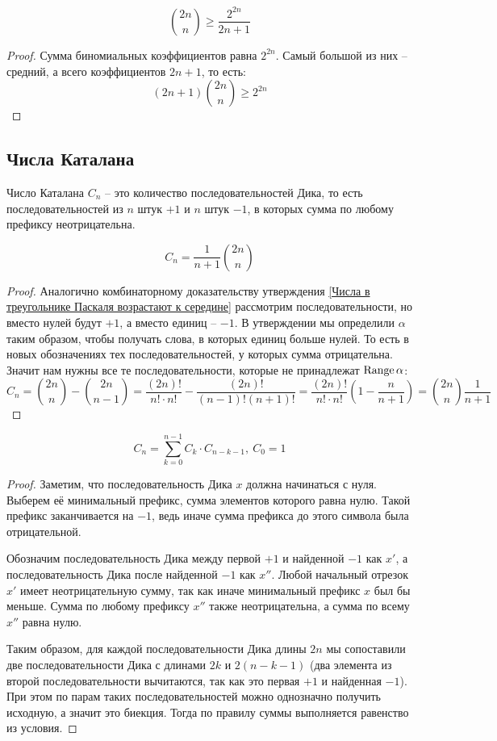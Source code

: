 \documentclass[12pt]{article}
\begin{document}
\begin{statement}
	\[\binom{2n}{n}\geqslant \frac{2^{2n}}{2n+1}\]	
	\begin{proof}
		Сумма биномиальных коэффициентов равна $2^{2n}$. Самый большой из
		них -- средний, а всего коэффициентов $2n+1$, то есть:
		\[(2n+1)\binom{2n}{n}\geqslant 2^{2n}\]	
	\end{proof}
\end{statement}

\subsection{Числа Каталана}

\begin{definition}
	Число Каталана $C_n$ -- это количество последовательностей Дика, то
	есть последовательностей из $n$ штук $+1$ и $n$ штук $-1$, в которых
	сумма по любому префиксу неотрицательна.
\end{definition}
\begin{theorem}
	\[C_n=\frac{1}{n+1}\binom{2n}{n}\]	
	\begin{proof}
		Аналогично комбинаторному доказательству утверждения \ref{Числа в
		треугольнике Паскаля возрастают к середине} рассмотрим
		последовательности, но вместо нулей будут $+1$, а вместо единиц
		-- $-1$. В утверждении мы определили $\alpha$ таким образом, чтобы
		получать слова, в которых единиц больше нулей. То есть в новых
		обозначениях тех последовательностей, у которых сумма отрицательна.
		Значит нам нужны все те последовательности, которые не принадлежат
		$\operatorname{Range} \alpha$:
		\[C_n=\binom{2n}{n}-\binom{2n}{n-1}=\frac{(2n)!}{n!\cdot
			n!}-\frac{(2n)!}{(n-1)!(n+1)!}=\frac{(2n)!}{n!\cdot
		n!}\left(1-\frac{n}{n+1}\right)=\binom{2n}{n}\frac{1}{n+1}\]	
	\end{proof}
\end{theorem}
\begin{theorem}
	\[C_n=\sum_{k=0}^{n-1}C_k\cdot C_{n-k-1},\ C_0=1\]	
	\begin{proof}
		Заметим, что последовательность Дика $x$ должна начинаться с нуля.
		Выберем её минимальный префикс, сумма элементов которого равна
		нулю. Такой префикс заканчивается на $-1$, ведь иначе сумма
		префикса до этого символа была отрицательной.\par

		Обозначим последовательность Дика между первой $+1$ и найденной
		$-1$ как $x'$, а последовательность Дика после найденной $-1$ как
		$x''$. Любой начальный отрезок $x'$ имеет неотрицательную сумму,
		так как иначе минимальный префикс $x$ был бы меньше. Сумма по
		любому префиксу $x''$ также неотрицательна, а сумма по всему $x''$
		равна нулю.\par

		Таким образом, для каждой последовательности Дика длины $2n$ мы
		сопоставили две последовательности Дика с длинами $2k$ и $2(n-k-1)$
		(два элемента из второй последовательности вычитаются, так как это
		первая $+1$ и найденная $-1$). При этом по парам таких
		последовательностей можно однозначно получить исходную, а значит
		это биекция. Тогда по правилу суммы выполняется равенство из условия.
	\end{proof}
\end{theorem}
\end{document}
